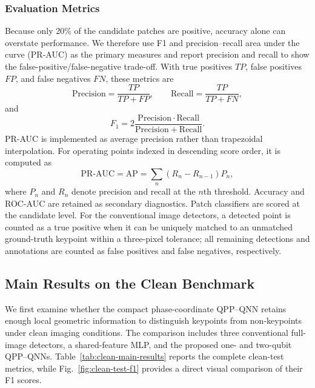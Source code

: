 \documentclass[11pt]{article}
\begin{document}
\subsubsection{Evaluation Metrics}
\label{sec:metrics}

Because only 20\% of the candidate patches are positive, accuracy alone can
overstate performance. We therefore use F1 and precision--recall area under the
curve (PR-AUC) as the primary measures and report precision and recall to show
the false-positive/false-negative trade-off. With true positives $TP$, false
positives $FP$, and false negatives $FN$, these metrics are
\begin{equation}
    \mathrm{Precision}=\frac{TP}{TP+FP},
    \qquad
    \mathrm{Recall}=\frac{TP}{TP+FN},
\end{equation}
and
\begin{equation}
    F_1=2\frac{\mathrm{Precision}\cdot\mathrm{Recall}}
    {\mathrm{Precision}+\mathrm{Recall}}.
\end{equation}
PR-AUC is implemented as average precision rather than trapezoidal
interpolation. For operating points indexed in descending score order, it is
computed as
\begin{equation}
    \mathrm{PR\mbox{-}AUC}
    =\mathrm{AP}
    =\sum_n\left(R_n-R_{n-1}\right)P_n,
\end{equation}
where $P_n$ and $R_n$ denote precision and recall at the $n$th threshold.
Accuracy and ROC-AUC are retained as secondary diagnostics. Patch classifiers
are scored at the candidate level. For the conventional image detectors, a
detected point is counted as a true positive when it can be uniquely matched
to an unmatched ground-truth keypoint within a three-pixel tolerance; all
remaining detections and annotations are counted as false positives and false
negatives, respectively.

\subsection{Main Results on the Clean Benchmark}
\label{sec:clean-main-results}

We first examine whether the compact phase-coordinate QPP--QNN retains enough
local geometric information to distinguish keypoints from non-keypoints under
clean imaging conditions. The comparison includes three conventional
full-image detectors, a shared-feature MLP, and the proposed one- and
two-qubit QPP--QNNs. Table~\ref{tab:clean-main-results} reports the complete
clean-test metrics, while Fig.~\ref{fig:clean-test-f1} provides a direct visual
comparison of their F1 scores.
\end{document}
